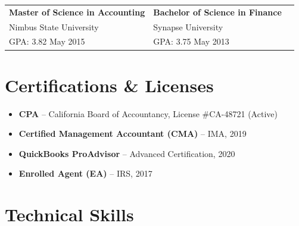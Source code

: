 \documentclass[11pt,letterpaper]{article}
\begin{document}
\begin{tabularx}{\textwidth}{@{}X X X@{}}
  \textbf{Master of Science in Accounting} & \textbf{Bachelor of Science in Finance} & \\
  Nimbus State University & Synapse University & \\
  GPA: 3.82 \textbar{} May 2015 & GPA: 3.75 \textbar{} May 2013 & \\
\end{tabularx}

\section{Certifications \& Licenses}

\begin{tcolorbox}[
  colback=white,
  colframe=lightgray,
  boxrule=0.6pt,
  arc=4pt,
  left=10pt,
  right=10pt,
  top=7pt,
  bottom=7pt,
  boxsep=0pt,
]

\begin{minipage}[t]{0.48\textwidth}
  \raggedright
  \begin{itemize}[leftmargin=*,nosep,itemsep=2pt]
    \item \textbf{CPA} -- California Board of Accountancy, License \#CA-48721 (Active)
    \item \textbf{Certified Management Accountant (CMA)} -- IMA, 2019
  \end{itemize}
\end{minipage}%
\hfill
\begin{minipage}[t]{0.48\textwidth}
  \raggedright
  \begin{itemize}[leftmargin=*,nosep,itemsep=2pt]
    \item \textbf{QuickBooks ProAdvisor} -- Advanced Certification, 2020
    \item \textbf{Enrolled Agent (EA)} -- IRS, 2017
  \end{itemize}
\end{minipage}

\end{tcolorbox}

\section{Technical Skills}
\end{document}
